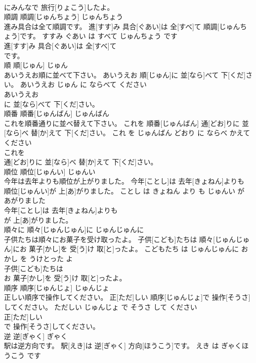 \documentclass[8pt]{extreport}
\begin{document}
\begin{CJK}{UTF8}{min}
\\	にみんなで 旅行[りょこう]したよ。			
\\	順調	順調[じゅんちょう]	じゅんちょう	
\\	進み具合は全て順調です。	進[すす]み 具合[ぐあい]は 全[すべ]て 順調[じゅんちょう]です。	すすみ ぐあい は すべて じゅんちょう です	
\\	進[すす]み 具合[ぐあい]は 全[すべ]て
\\	です。			
\\	順	順[じゅん]	じゅん	
\\	あいうえお順に並べて下さい。	あいうえお 順[じゅん]に 並[なら]べて 下[くだ]さい。	あいうえお じゅん に ならべて ください	
\\	あいうえお
\\	に 並[なら]べて 下[くだ]さい。			
\\	順番	順番[じゅんばん]	じゅんばん	
\\	これを順番通りに並べ替えて下さい。	これを 順番[じゅんばん] 通[どお]りに 並[なら]べ 替[か]えて 下[くだ]さい。	これ を じゅんばん どおり に ならべ かえて ください	
\\	これを
\\	通[どお]りに 並[なら]べ 替[か]えて 下[くだ]さい。			
\\	順位	順位[じゅんい]	じゅんい	
\\	今年は去年よりも順位が上がりました。	今年[ことし]は 去年[きょねん]よりも 順位[じゅんい]が 上[あ]がりました。	ことし は きょねん より も じゅんい が あがりました	
\\	今年[ことし]は 去年[きょねん]よりも
\\	が 上[あ]がりました。			
\\	順々に	順々[じゅんじゅん]に	じゅんじゅんに	
\\	子供たちは順々にお菓子を受け取ったよ。	子供[こども]たちは 順々[じゅんじゅん]にお 菓子[かし]を 受[う]け 取[と]ったよ。	こどもたち は じゅんじゅんに おかし を うけとった よ	
\\	子供[こども]たちは
\\	お 菓子[かし]を 受[う]け 取[と]ったよ。			
\\	順序	順序[じゅんじょ]	じゅんじょ	
\\	正しい順序で操作してください。	正[ただ]しい 順序[じゅんじょ]で 操作[そうさ]してください。	ただしい じゅんじょ で そうさ して ください	
\\	正[ただ]しい
\\	で 操作[そうさ]してください。			
\\	逆	逆[ぎゃく]	ぎゃく	
\\	駅は逆方向です。	駅[えき]は 逆[ぎゃく] 方向[ほうこう]です。	えき は ぎゃくほうこう です	

\end{CJK}
\end{document}
